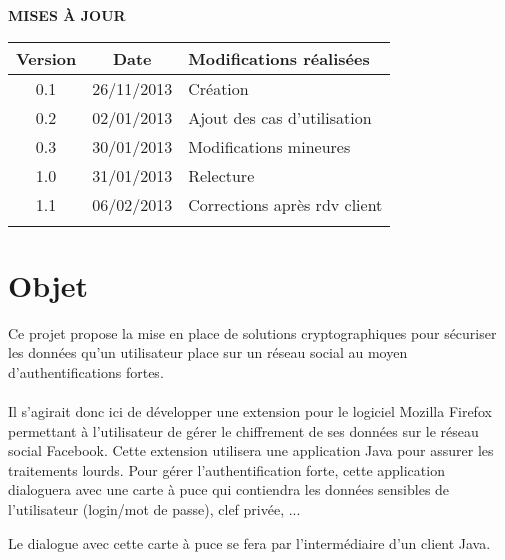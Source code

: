 \documentclass[a4paper,11pt,french]{article}
\begin{document}
\makeFirstPage
\clearpage

\vspace*{1cm}
\begin{center}
\textbf{\huge{MISES À JOUR}}\\
\vspace*{3cm}
	\begin{tabularx}{16cm}{|c|c|X|}
	\hline
	\bfseries{Version} & \bfseries{Date} & \bfseries{Modifications réalisées}\\
	\hline
	0.1 & 26/11/2013 & Création\\
	\hline
    0.2 & 02/01/2013 & Ajout des cas d'utilisation\\
	\hline
    0.3 & 30/01/2013 & Modifications mineures\\
	\hline
    1.0 & 31/01/2013 & Relecture \\
	\hline
    1.1 & 06/02/2013 & Corrections après rdv client \\
	\hline
	&&\\
	\hline
	\end{tabularx}
\end{center}

\clearpage
\tableofcontents
\clearpage

\section{Objet}
\renewcommand\labelitemi{\textbullet} %
\renewcommand\labelitemii{$\circ$} %
Ce projet propose la mise en place de solutions cryptographiques pour 
sécuriser les données qu’un utilisateur place sur un réseau social au moyen 
d’authentifications fortes.

\paragraph{}
Il s’agirait donc ici de développer une extension pour le logiciel Mozilla 
Firefox permettant à l’utilisateur de gérer le chiffrement de ses données sur 
le réseau social Facebook. Cette extension utilisera
une application Java pour assurer les traitements lourds. Pour gérer 
l’authentification forte, cette application dialoguera avec une carte à puce 
qui contiendra les données sensibles de l’utilisateur (login/mot de passe), 
clef privée, ...

Le dialogue avec cette carte à puce se fera par l’intermédiaire d’un 
client Java. 
\end{document}
